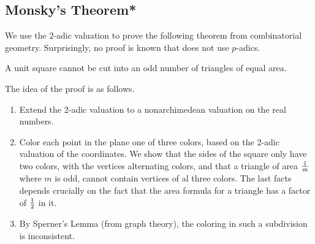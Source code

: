 \subsection{Monsky's Theorem*}
We use the $2$-adic valuation to prove the following theorem from combinatorial geometry. Surprisingly, no proof is known that does not use $p$-adics.
\begin{thm}
A unit square cannot be cut into an odd number of triangles of equal area.
\end{thm}
The idea of the proof is as follows.
\begin{enumerate}
\item Extend the 2-adic valuation to a nonarchimedean valuation on the real numbers.
\item Color each point in the plane one of three colors, based on the 2-adic valuation of the coordinates. We show that the sides of the square only have two colors, with the vertices alternating colors, and that a triangle of area $\frac{1}{m}$ where $m$ is odd, cannot contain vertices of al three colors. The last facts depends crucially on the fact that the area formula for a triangle has a factor of $\frac{1}{2}$ in it.
\item By Sperner's Lemma (from graph theory), the coloring in such a subdivision is inconsistent. %
\end{enumerate}
